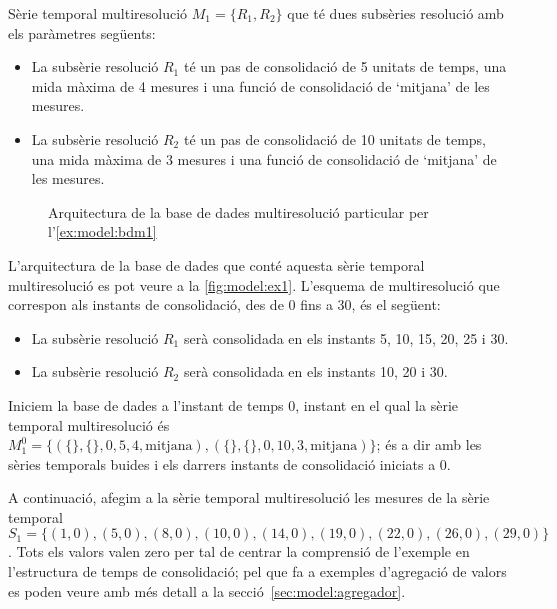 \begin{example} 
\label{ex:model:bdm1}%


Sèrie temporal multiresolució $M_1=\{R_1,R_2\}$ que té dues subsèries
resolució amb els paràmetres següents:
\begin{itemize}
\item La subsèrie resolució $R_1$ té un pas de consolidació de 5
  unitats de temps, una mida màxima de 4 mesures i una funció de
  consolidació de `mitjana' de les mesures.
\item La subsèrie resolució $R_2$ té un pas de consolidació de 10
  unitats de temps, una mida màxima de 3 mesures i una funció de
  consolidació de `mitjana' de les mesures.
\end{itemize}

\begin{figure}[tp]
\centering

\caption{Arquitectura de la base de dades multiresolució particular
  per l'\autoref{ex:model:bdm1}}
\label{fig:model:ex1}
\end{figure}

L'arquitectura de la base de dades que conté aquesta sèrie temporal
multiresolució es pot veure a la \autoref{fig:model:ex1}. 
 L'esquema
de multiresolució que correspon als instants de consolidació, des de 0
fins a 30, és el següent:
\begin{itemize}
\item La subsèrie resolució $R_1$ serà consolidada en els instants 5,
  10, 15, 20, 25 i 30.
\item La subsèrie resolució $R_2$ serà consolidada en els instants 10,
  20 i 30.
\end{itemize}


Iniciem la base de dades a l'instant de temps 0, instant en el qual la
sèrie temporal multiresolució és $M_1^0 = \{ ( \{\} , \{\} , 0 , 5 ,4
, \text{mitjana} ) , ( \{\} , \{\} , 0 , 10 ,3 , \text{mitjana} ) \}$;
és a dir amb les sèries temporals buides i els darrers instants de
consolidació iniciats a 0.




A continuació, afegim a la sèrie temporal multiresolució les mesures
de la sèrie temporal $S_1=\{
(1,0),(5,0),(8,0),(10,0),(14,0),(19,0),(22,0),(26,0),(29,0) \}$. Tots
els valors valen zero per tal de centrar la comprensió de l'exemple en
l'estructura de temps de consolidació; pel que fa a exemples
d'agregació de valors es poden veure amb més detall a la
secció~\ref{sec:model:agregador}.



\end{example}
